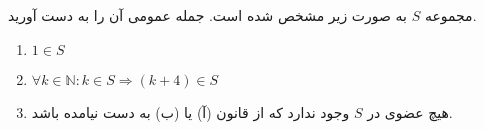 \begin{problem}
    \p
مجموعه
$S$
به صورت زیر مشخص شده است. جمله عمومی آن را به دست آورید.
	\p
	\begin{enumerate}
\item
$1 \in S$
	\p
\item
$\forall k \in \mathbb{N} : k \in S \Rightarrow (k + 4) \in S$
	\p
\item
هیچ عضوی در
$S$
وجود ندارد که از قانون (آ) یا (ب) به دست نیامده باشد.
	\p    
	
        \end{enumerate}
\end{problem}